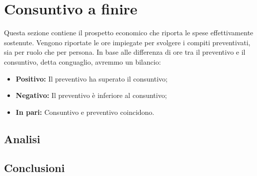 \section{Consuntivo a finire}
Questa sezione contiene il prospetto economico che riporta le spese effettivamente sostenute. Vengono riportate le ore impiegate per svolgere i compiti preventivati, sia per ruolo che per persona. In base alle differenza di ore tra il preventivo e il consuntivo, detta conguaglio, avremmo un bilancio: \\
\begin{itemize}
	\item \textbf{Positivo:} Il preventivo ha superato il consuntivo; \\
	\item \textbf{Negativo:} Il preventivo è inferiore al consuntivo; \\
	\item \textbf{In pari:} Consuntivo e preventivo coincidono. \\
\end{itemize}
	\subsection{Analisi}
	\subsection{Conclusioni}